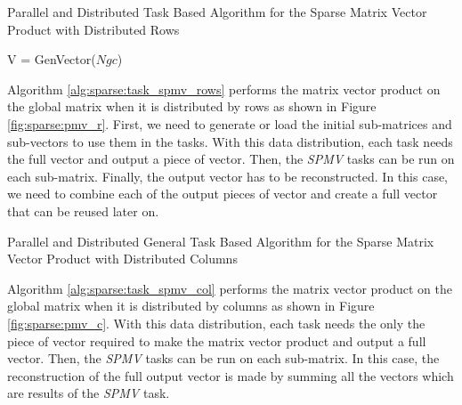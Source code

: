 \begin{algorithm}[h]
	\DontPrintSemicolon
	\caption{Parallel and Distributed Task Based Algorithm for the Sparse  Matrix Vector Product with Distributed Rows \label{alg:sparse:task_spmv_rows}}
	V = GenVector($Ngc$)\;
	\;
	\;

\end{algorithm}

Algorithm \ref{alg:sparse:task_spmv_rows} performs the matrix vector product on the global matrix when it is distributed by rows as shown in Figure \ref{fig:sparse:pmv_r}.
First, we need to generate or load the initial sub-matrices and sub-vectors to use them in the tasks.
With this data distribution, each task needs the full vector and output a piece of vector.
Then, the \textit{SPMV} tasks can be run on each sub-matrix.
Finally, the output vector has to be reconstructed.
In this case, we need to combine each of the output pieces of vector and create a full vector that can be reused later on.


\begin{algorithm}[h]
	\DontPrintSemicolon
	\caption{Parallel and Distributed General Task Based Algorithm for the Sparse  Matrix Vector Product with Distributed Columns \label{alg:sparse:task_spmv_col}}
	\;
	\;
\end{algorithm}

Algorithm \ref{alg:sparse:task_spmv_col} performs the matrix vector product on the global matrix when it is distributed by columns as shown in Figure \ref{fig:sparse:pmv_c}.
With this data distribution, each task needs the only the piece of vector required to make the matrix vector product and output a full vector.
Then, the \textit{SPMV} tasks can be run on each sub-matrix.
In this case, the reconstruction of the full output vector is made by summing all the vectors which are results of the \textit{SPMV} task.


